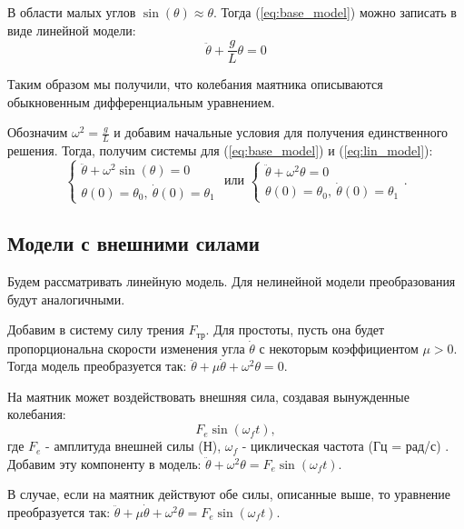 В области малых углов $\sin(\theta) \approx \theta$.
Тогда (\ref{eq:base_model}) можно записать в виде линейной модели:
\begin{equation}
	\ddot{\theta} +\frac{g}{L}\theta = 0
	\label{eq:lin_model}
\end{equation}

Таким образом мы получили, что колебания маятника описываются обыкновенным дифференциальным уравнением. 

Обозначим $\omega^2 = \frac{g}{L}$ и добавим начальные условия для получения единственного решения. Тогда, получим системы для (\ref{eq:base_model}) и (\ref{eq:lin_model}):
\begin{equation}
	\begin{cases}
		\ddot{\theta} + \omega^2 \sin(\theta) = 0 \\
		\theta(0) = \theta_0, \ \dot{\theta}(0) = \theta_1
	\end{cases}
	\text{ или }
	\begin{cases}
		\ddot{\theta} + \omega^2 \theta = 0 \\
		\theta(0) = \theta_0, \ \dot{\theta}(0) = \theta_1
	\end{cases}.
\end{equation}

\subsection*{Модели с внешними силами}
Будем рассматривать линейную модель. Для нелинейной модели преобразования будут аналогичными.

Добавим в систему силу трения $F_{\text{тр}}$. Для простоты, пусть она будет пропорциональна скорости  изменения угла $\dot{\theta}$ с некоторым коэффициентом $\mu > 0$. Тогда модель преобразуется так: $\ddot{\theta} + \mu\dot{\theta} + \omega^2 \theta = 0 $.

На маятник может воздействовать внешняя сила, создавая вынужденные колебания: $$F_e\sin(\omega_f t),$$ где $F_e$ - амплитуда внешней силы (Н), $\omega_f$ - циклическая частота (Гц = рад/с) . Добавим эту компоненту в модель: $\ddot{\theta}  + \omega^2 \theta = F_e\sin(\omega_f t) $.

В случае, если на маятник действуют обе силы, описанные выше, то уравнение преобразуется так: $\ddot{\theta} + \mu \dot{\theta}  + \omega^2 \theta = F_e\sin(\omega_f t) $.



 
 
 
